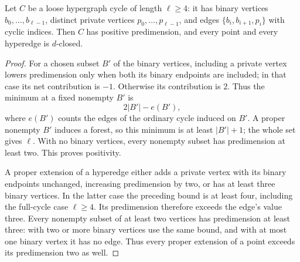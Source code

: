 \begin{lemma}
\label{A:predimension-loose-cycle}
Let $C$ be a loose hypergraph cycle of length $\ell\geq4$: it has
binary vertices $b_0,\ldots,b_{\ell-1}$, distinct private vertices
$p_0,\ldots,p_{\ell-1}$, and edges
$\{b_i,b_{i+1},p_i\}$ with cyclic indices. Then $C$ has positive
predimension, and every point and every hyperedge is $d$-closed.
\end{lemma}
\begin{proof}
For a chosen subset $B'$ of the binary vertices, including a private
vertex lowers predimension only when both its binary endpoints are
included; in that case its net contribution is $-1$. Otherwise its
contribution is $2$. Thus the minimum at a fixed nonempty $B'$ is
\[
 2|B'|-e(B'),
\]
where $e(B')$ counts the edges of the ordinary cycle induced on
$B'$. A proper nonempty $B'$ induces a forest, so this minimum is
at least $|B'|+1$; the whole set gives $\ell$. With no binary
vertices, every nonempty subset has predimension at least two.
This proves positivity.

A proper extension of a hyperedge either adds a private vertex
with its binary endpoints unchanged, increasing predimension by
two, or has at least three binary vertices. In the latter case the
preceding bound is at least four, including the full-cycle case
$\ell\geq4$. Its predimension therefore exceeds the edge's value
three. Every nonempty subset of at least two vertices has
predimension at least three: with two or more binary vertices use
the same bound, and with at most one binary vertex it has no edge.
Thus every proper extension of a point exceeds its predimension
two as well.
\end{proof}

